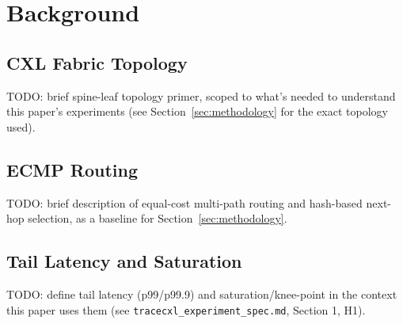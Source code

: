 %

\section{Background}
\label{sec:background}

\subsection{CXL Fabric Topology}
TODO: brief spine-leaf topology primer, scoped to what's needed to
understand this paper's experiments (see Section~\ref{sec:methodology}
for the exact topology used).

\subsection{ECMP Routing}
TODO: brief description of equal-cost multi-path routing and hash-based
next-hop selection, as a baseline for Section~\ref{sec:methodology}.

\subsection{Tail Latency and Saturation}
TODO: define tail latency (p99/p99.9) and saturation/knee-point in the
context this paper uses them (see
\texttt{tracecxl\_experiment\_spec.md}, Section 1, H1).
